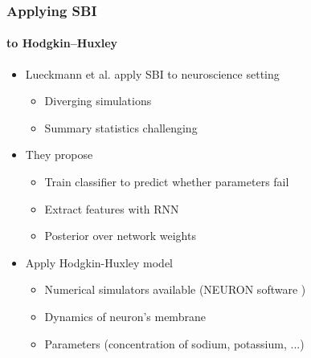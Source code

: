 \documentclass[9pt, aspectratio=169]{beamer}
\begin{document}
\begin{frame}
\frametitle{Applying SBI}
\framesubtitle{to Hodgkin–Huxley}
\begin{itemize}
	\item Lueckmann et al. \cite{lueckmann2017flexible} apply SBI to neuroscience setting
	\begin{itemize}
		\item Diverging simulations
		\item Summary statistics challenging
	\end{itemize}
	\item They propose
	\begin{itemize}
			\item Train classifier to predict whether parameters fail
		\item Extract features with RNN
					\item Posterior over network weights%
	\end{itemize}
		\item Apply Hodgkin-Huxley model \cite{hodgkin1952quantitative} 
\begin{itemize}
	\item Numerical simulators available (NEURON software \cite{carnevale2006neuron})
	\item Dynamics of neuron's membrane
	\item Parameters (concentration of sodium, potassium, ...)
\end{itemize}
\end{itemize}
\end{frame}  
%
\end{document}
